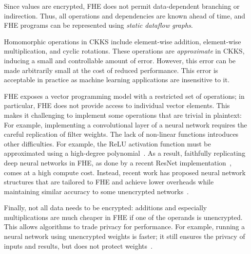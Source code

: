 Since values are encrypted, FHE does not permit data-dependent branching or indirection.
Thus, all operations and dependencies are known ahead of time, and FHE programs can
be represented using \emph{static dataflow graphs}.

Homomorphic operations in CKKS include element-wise addition, element-wise multiplication,
and cyclic rotations.
These operations are \emph{approximate} in CKKS, inducing a small and
controllable amount of error. However, this error can be made arbitrarily small at the
cost of reduced performance. %
This error is acceptable in practice as machine learning applications
are insensitive to it.

FHE exposes a vector programming model with a restricted set of operations; in particular,
FHE does not provide access to individual vector elements.
This makes it challenging to implement some operations
that are trivial in plaintext:
For example,
implementing a convolutional layer of a neural network requires the careful
replication of filter weights.
The lack of non-linear functions introduces other difficulties.
For example, the ReLU activation function must be approximated
using a high-degree polynomial~\cite{lee:2021:precise}.
%
As a result, faithfully replicating deep neural networks in FHE,
as done by a recent ResNet implementation~\cite{lee:2021:privacy}, comes at a high compute cost.
Instead, recent work has proposed neural network structures that are tailored to
FHE and achieve lower overheads while maintaining similar accuracy to some unencrypted networks~\cite{brutzkus:icml19:low}.

Finally, not all data needs to be encrypted:
additions and especially multiplications are much cheaper in FHE if one of the operands is unencrypted.
This allows algorithms to trade privacy for performance.
For example, running a neural network using unencrypted weights is faster; it
still ensures the privacy of inputs and results, but does not
protect weights~\cite{brutzkus:icml19:low}.

